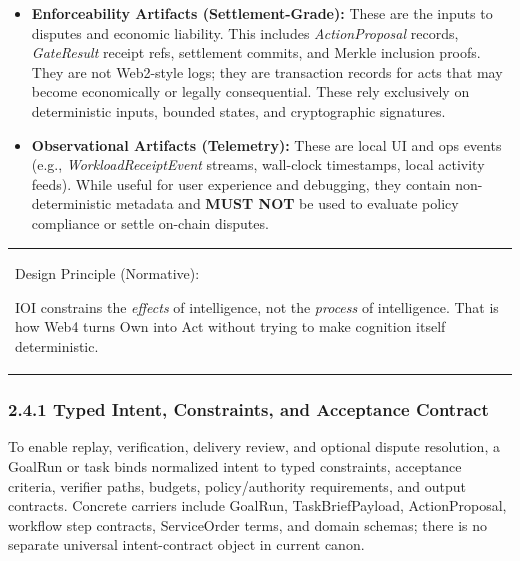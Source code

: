 \documentclass[
  11pt,
]{article}
\providecommand{\tightlist}{%
  \setlength{\itemsep}{0pt}\setlength{\parskip}{0pt}}
\begin{document}
\begin{itemize}
\tightlist
\item
  \textbf{Enforceability Artifacts (Settlement-Grade):} These are the
  inputs to disputes and economic liability. This includes
  \emph{ActionProposal} records, \emph{GateResult} receipt refs, settlement
  commits, and Merkle inclusion proofs. They are not Web2-style logs;
  they are transaction records for acts that may become economically or
  legally consequential. These rely exclusively on deterministic inputs,
  bounded states, and cryptographic signatures.
\item
  \textbf{Observational Artifacts (Telemetry):} These are local UI and
  ops events (e.g., \emph{WorkloadReceiptEvent} streams, wall-clock
  timestamps, local activity feeds). While useful for user experience
  and debugging, they contain non-deterministic metadata and
  \textbf{MUST NOT} be used to evaluate policy compliance or settle
  on-chain disputes.
\end{itemize}

\begin{longtable}[]{@{}
  >{\raggedright\arraybackslash}p{}@{}}
\toprule\noalign{}
 \\
\midrule\noalign{}
\endhead
\bottomrule\noalign{}
\endlastfoot
Design Principle (Normative):

IOI constrains the \emph{effects }of intelligence, not the
\emph{process} of intelligence. That is how Web4 turns Own into Act
without trying to make cognition itself deterministic. \\
\end{longtable}

\hypertarget{the-intent-contract-schema-ics}{%
\subsubsection{2.4.1 Typed Intent, Constraints, and Acceptance
Contract}\label{the-intent-contract-schema-ics}}

To enable replay, verification, delivery review, and optional dispute
resolution, a GoalRun or task binds normalized intent to typed constraints,
acceptance criteria, verifier paths, budgets, policy/authority requirements,
and output contracts. Concrete carriers include GoalRun, TaskBriefPayload,
ActionProposal, workflow step contracts, ServiceOrder terms, and domain
schemas; there is no separate universal intent-contract object in current
canon.
\end{document}
